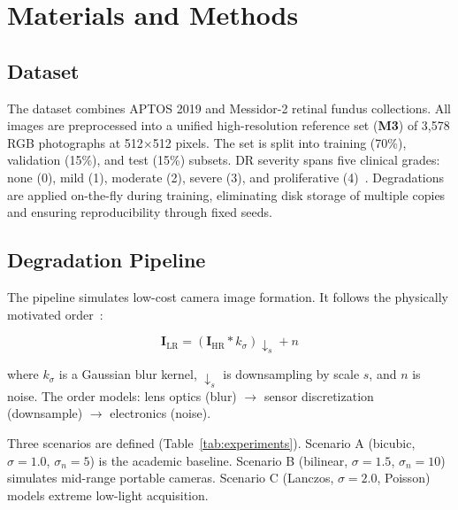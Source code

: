 \section{Materials and Methods}
\label{sec:methods}

\subsection{Dataset}

The dataset combines APTOS 2019 and Messidor-2 retinal fundus collections.
All images are preprocessed into a unified high-resolution reference set (\textbf{M3}) of 3,578 RGB photographs at 512$\times$512 pixels.
The set is split into training (70\%), validation (15\%), and test (15\%) subsets.
DR severity spans five clinical grades: none (0), mild (1), moderate (2), severe (3), and proliferative (4)~\cite{gulshan2016}.
Degradations are applied on-the-fly during training, eliminating disk storage of multiple copies and ensuring reproducibility through fixed seeds.

\subsection{Degradation Pipeline}

The pipeline simulates low-cost camera image formation.
It follows the physically motivated order~\cite{ledig2017}:

\begin{equation}
\mathbf{I}_{\text{LR}} = \left( \mathbf{I}_{\text{HR}} * k_\sigma \right) \downarrow_s + n
\label{eq:degradation}
\end{equation}

where $k_\sigma$ is a Gaussian blur kernel, $\downarrow_s$ is downsampling by scale $s$, and $n$ is noise.
The order models: lens optics (blur) $\rightarrow$ sensor discretization (downsample) $\rightarrow$ electronics (noise).

Three scenarios are defined (Table~\ref{tab:experiments}).
Scenario A (bicubic, $\sigma=1.0$, $\sigma_n=5$) is the academic baseline.
Scenario B (bilinear, $\sigma=1.5$, $\sigma_n=10$) simulates mid-range portable cameras.
Scenario C (Lanczos, $\sigma=2.0$, Poisson) models extreme low-light acquisition.

